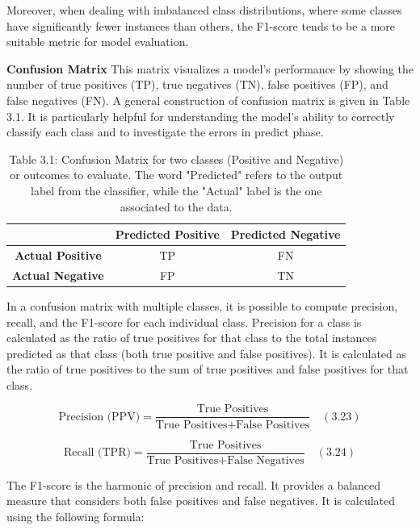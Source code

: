 \documentclass{Configuration_Files/PoliMi3i_thesis}
\begin{document}
Moreover, when dealing with imbalanced class distributions, where some classes have significantly fewer instances than others, the F1-score tends to be a more suitable metric for model evaluation.


\textbf{Confusion Matrix} \quad This matrix visualizes a model’s performance by showing the number of true positives (TP), true negatives (TN), false positives (FP), and false negatives (FN). A general construction of confusion matrix is given in Table 3.1. It is particularly helpful for understanding the model’s ability to correctly classify each class and to investigate the errors in predict phase.

\begin{table}[h!]
\centering
\caption*{Table 3.1: Confusion Matrix for two classes (Positive and Negative) or outcomes to evaluate. The word "Predicted" refers to the output label from the classifier, while the "Actual" label is the one associated to the data.}
\begin{tabular}{|c|c|c|}
\hline
 & \textbf{Predicted Positive} & \textbf{Predicted Negative} \\
\hline
\textbf{Actual Positive} & TP & FN \\
\hline
\textbf{Actual Negative} & FP & TN \\
\hline
\end{tabular}
\end{table}

In a confusion matrix with multiple classes, it is possible to compute precision, recall, and the F1-score for each individual class. Precision for a class is calculated as the ratio of true positives for that class to the total instances predicted as that class (both true positive and false positives). It is calculated as the ratio of true positives to the sum of true positives and false positives for that class.

\begin{equation}
	\text{Precision (PPV)} = \frac{\text{True Positives}}{\text{True Positives} + \text{False Positives}} \quad (3.23)
	\end{equation}
	
	\begin{equation}
	\text{Recall (TPR)} = \frac{\text{True Positives}}{\text{True Positives} + \text{False Negatives}} \quad (3.24)
	\end{equation}

The F1-score is the harmonic of precision and recall. It provides a balanced measure that considers both false positives and false negatives. It is calculated using the following formula:
\end{document}
